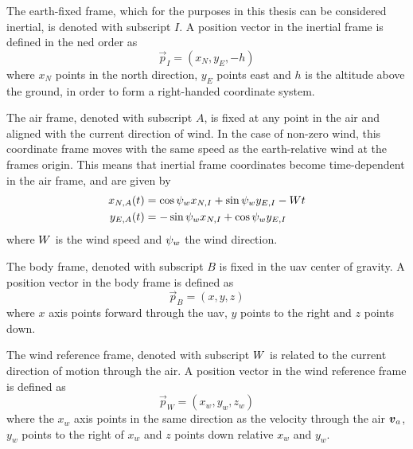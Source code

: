 \begin{definition}
    The earth-fixed frame, which for the purposes in this thesis can be considered inertial, is denoted with subscript $I$.
    A position vector in the inertial frame is defined in the \ac{ned} order as
    \begin{equation}
        \vec{p}_I = (x_N, y_E, -h)
    \end{equation}
    where $x_N$ points in the north direction, $y_E$ points east and $h$ is the altitude above the ground,
    in order to form a right-handed coordinate system.
\end{definition}

\begin{definition}
    The air frame, denoted with subscript $A$, is fixed at any point in the air and aligned with the current direction of wind. In the case of non-zero wind,
    this coordinate frame moves with the same speed as the earth-relative wind at the frames origin.
    This means that inertial frame coordinates become time-dependent in the air frame, and are given by
    \begin{align}
        x_{N,A}(t) &= \cos\psi_w x_{N,I} + \sin\psi_w y_{E,I} - Wt\\
        y_{E,A}(t) &= -\sin\psi_w x_{N,I} + \cos\psi_w y_{E,I}
    \end{align}
    where $W$ is the wind speed and $\psi_w$ the wind direction.
\end{definition}

\begin{definition}
    The body frame, denoted with subscript $B$ is fixed in the \ac{uav} center of gravity.
    A position vector in the body frame is defined as
    \begin{equation}
        \vec{p}_B = (x, y, z)
    \end{equation}
    where $x$ axis points forward through the \ac{uav}, $y$ points to the right and $z$ points down.
\end{definition}

\begin{definition}
    The wind reference frame, denoted with subscript $W$ is related to the current direction of motion
    through the air.
    A position vector in the wind reference frame is defined as
    \begin{equation}
        \vec{p}_W = (x_w, y_w, z_w)
    \end{equation}
    where the $x_w$ axis points in the same direction as the velocity through the air $\boldsymbol{v}_a$, 
    $y_w$ points to the right of $x_w$ and $z$ points down relative $x_w$ and $y_w$.
\end{definition}

